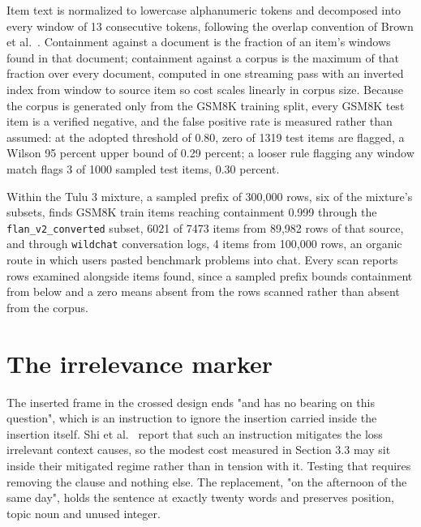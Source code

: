 \documentclass{article}
\begin{document}
Item text is normalized to lowercase alphanumeric tokens and decomposed into every window
of 13 consecutive tokens, following the overlap convention of
Brown et al.~\citep{brown2020fewshot}. Containment against a document is the fraction of
an item's windows found in that document; containment against a corpus is the maximum of
that fraction over every document, computed in one streaming pass with an inverted index
from window to source item so cost scales linearly in corpus size. Because the corpus is
generated only from the GSM8K training split, every GSM8K test item is a verified
negative, and the false positive rate is measured rather than assumed: at the adopted
threshold of 0.80, zero of 1319 test items are flagged, a Wilson 95 percent upper bound
of 0.29 percent; a looser rule flagging any window match flags 3 of 1000 sampled test
items, 0.30 percent.

Within the Tulu 3 mixture, a sampled prefix of 300{,}000 rows, six of the mixture's
subsets, finds GSM8K train items reaching containment 0.999 through the
\texttt{flan\_v2\_converted} subset, 6021 of 7473 items from 89{,}982 rows of that source,
and through \texttt{wildchat} conversation logs, 4 items from 100{,}000 rows, an organic
route in which users pasted benchmark problems into chat. Every scan reports rows
examined alongside items found, since a sampled prefix bounds containment from below and
a zero means absent from the rows scanned rather than absent from the corpus.

\section{The irrelevance marker}
\label{app:marker}

The inserted frame in the crossed design ends "and has no bearing on this question", which
is an instruction to ignore the insertion carried inside the insertion itself.
Shi et al.~\citep{shi2023distracted} report that such an instruction mitigates the loss
irrelevant context causes, so the modest cost measured in Section 3.3 may sit inside their
mitigated regime rather than in tension with it. Testing that requires removing the clause
and nothing else. The replacement, "on the afternoon of the same day", holds the sentence at
exactly twenty words and preserves position, topic noun and unused integer.
\end{document}

